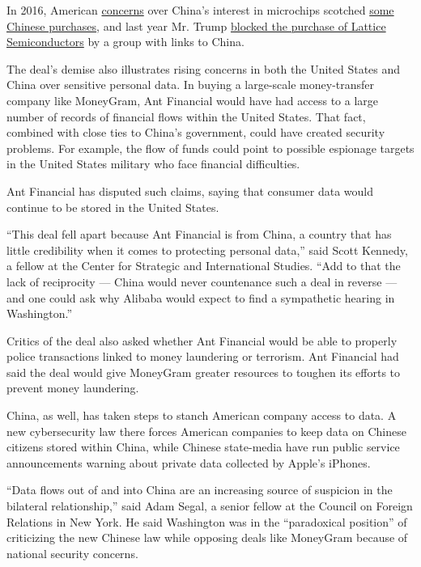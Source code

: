 In 2016, American
\href{https://www.nytimes.com/2016/02/05/technology/concern-grows-in-us-over-chinas-drive-to-make-chips.html}{concerns}
over China's interest in microchips scotched
\href{https://www.nytimes.com/2016/12/02/business/dealbook/china-aixtron-obama-cfius.html}{some
Chinese purchases}, and last year Mr. Trump
\href{https://www.nytimes.com/2017/09/13/business/trump-lattice-semiconductor-china.html}{blocked
the purchase of Lattice Semiconductors} by a group with links to China.

The deal's demise also illustrates rising concerns in both the United
States and China over sensitive personal data. In buying a large-scale
money-transfer company like MoneyGram, Ant Financial would have had
access to a large number of records of financial flows within the United
States. That fact, combined with close ties to China's government, could
have created security problems. For example, the flow of funds could
point to possible espionage targets in the United States military who
face financial difficulties.

Ant Financial has disputed such claims, saying that consumer data would
continue to be stored in the United States.

``This deal fell apart because Ant Financial is from China, a country
that has little credibility when it comes to protecting personal data,''
said Scott Kennedy, a fellow at the Center for Strategic and
International Studies. ``Add to that the lack of reciprocity --- China
would never countenance such a deal in reverse --- and one could ask why
Alibaba would expect to find a sympathetic hearing in Washington.''

Critics of the deal also asked whether Ant Financial would be able to
properly police transactions linked to money laundering or terrorism.
Ant Financial had said the deal would give MoneyGram greater resources
to toughen its efforts to prevent money laundering.

China, as well, has taken steps to stanch American company access to
data. A new cybersecurity law there forces American companies to keep
data on Chinese citizens stored within China, while Chinese state-media
have run public service announcements warning about private data
collected by Apple's iPhones.

``Data flows out of and into China are an increasing source of suspicion
in the bilateral relationship,'' said Adam Segal, a senior fellow at the
Council on Foreign Relations in New York. He said Washington was in the
``paradoxical position'' of criticizing the new Chinese law while
opposing deals like MoneyGram because of national security concerns.

